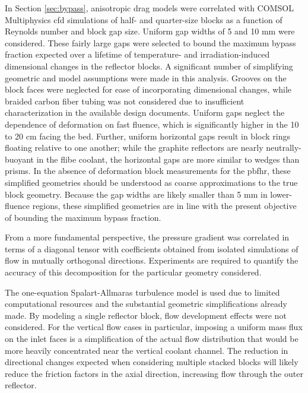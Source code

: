 In Section \ref{sec:bypass}, anisotropic drag models were correlated with COMSOL Multiphysics \gls{cfd} simulations of half- and quarter-size blocks as a function of Reynolds number and block gap size. Uniform gap widths of 5 and 10 \si{\milli\meter} were considered. These fairly large gaps were selected to bound the maximum bypass fraction expected over a lifetime of temperature- and irradiation-induced dimensional changes in the reflector blocks. A significant number of simplifying geometric and model assumptions were made in this analysis. Grooves on the block faces were neglected for ease of incorporating dimensional changes, while braided carbon fiber tubing was not considered due to insufficient characterization in the available design documents. Uniform gaps neglect the dependence of deformation on fast fluence, which is significantly higher in the 10 to 20 \si{\centi\meter} facing the bed. Further, uniform horizontal gaps result in block rings floating relative to one another; while the graphite reflectors are nearly neutrally-buoyant in the \gls{flibe} coolant, the horizontal gaps are more similar to wedges than prisms. In the absence of deformation block measurements for the \gls{pbfhr}, these simplified geometries should be understood as coarse approximations to the true block geometry. Because the gap widths are likely smaller than 5 \si{\milli\meter} in lower-fluence regions, these simplified geometries are in line with the present objective of bounding the maximum bypass fraction.

From a more fundamental perspective, the pressure gradient was correlated in terms of a diagonal tensor with coefficients obtained from isolated simulations of flow in mutually orthogonal directions. Experiments are required to quantify the accuracy of this decomposition for the particular geometry considered.

The one-equation Spalart-Allmaras turbulence model is used due to limited computational resources and the substantial geometric simplifications already made. By modeling a single reflector block, flow development effects were not considered. For the vertical flow cases in particular, imposing a uniform mass flux on the inlet faces is a simplification of the actual flow distribution that would be more heavily concentrated near the vertical coolant channel. The reduction in directional changes expected when considering multiple stacked blocks will likely reduce the friction factors in the axial direction, increasing flow through the outer reflector.

